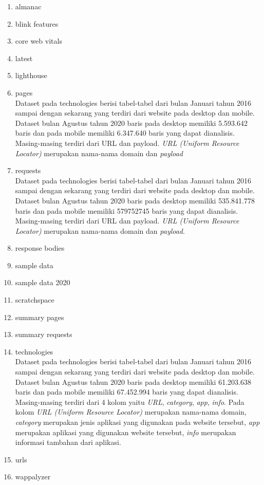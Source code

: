 \begin{enumerate}
	\item almanac\\
	\item blink features\\
	\item core web vitals\\
	\item latest\\
	\item lighthouse\\
	\item pages\\
	Dataset pada technologies berisi tabel-tabel dari bulan Januari tahun 2016 sampai dengan sekarang yang terdiri dari website pada desktop dan mobile. Dataset bulan Agustus tahun 2020 baris pada desktop memiliki 5.593.642 baris dan pada mobile memiliki 6.347.640 baris yang dapat dianalisis. Masing-masing terdiri dari URL dan payload. \textit{URL (Uniform Resource Locator)} merupakan nama-nama domain dan \textit{payload}
	\item requests\\
	Dataset pada technologies berisi tabel-tabel dari bulan Januari tahun 2016 sampai dengan sekarang yang terdiri dari website pada desktop dan mobile. Dataset bulan Agustus tahun 2020 baris pada desktop memiliki 535.841.778 baris dan pada mobile memiliki 579752745 baris yang dapat dianalisis. Masing-masing terdiri dari URL dan payload. \textit{URL (Uniform Resource Locator)} merupakan nama-nama domain dan \textit{payload}.
	\item response bodies\\
	\item sample data\\
	\item sample data 2020\\
	\item scratchspace\\
	\item summary pages\\
	\item summary requests\\
	\item technologies\\
	Dataset pada technologies berisi tabel-tabel dari bulan Januari tahun 2016 sampai dengan sekarang yang terdiri dari website pada desktop dan mobile. Dataset bulan Agustus tahun 2020 baris pada desktop memiliki 61.203.638 baris dan pada mobile memiliki 67.452.994 baris yang dapat dianalisis. Masing-masing terdiri dari 4 kolom yaitu \textit{URL}, \textit{category}, \textit{app}, \textit{info}. Pada kolom \textit{URL (Uniform Resource Locator)} merupakan nama-nama domain, \textit{category} merupakan jenis aplikasi yang digunakan pada website tersebut, \textit{app} merupakan aplikasi yang digunakan website tersebut, \textit{info} merupakan informasi tambahan dari aplikasi. 
	\item urls\\
	\item wappalyzer\\
\end{enumerate}


